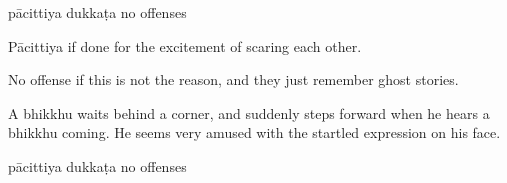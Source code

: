 \begin{exam}{\autoExamName}
\begin{problem*}
\begin{parts}
      \bigskip

      \begin{answers}{3}
        \bChoices
         pācittiya\eAns
         dukkaṭa\eAns
         no offenses\eAns
        \eChoices
      \end{answers}

      \begin{solution}
        Pācittiya if done for the excitement of scaring each other.

        No offense if this is not the reason, and they just remember ghost stories.
      \end{solution}

      \bigskip

      \item A bhikkhu waits behind a corner, and suddenly steps forward when he
      hears a bhikkhu coming. He seems very amused with the startled expression
      on his face.

      \bigskip

      \begin{answers}{3}
        \bChoices
         pācittiya\eAns
         dukkaṭa\eAns
         no offenses\eAns
        \eChoices
      \end{answers}

    \end{parts}

  \end{problem*}

\end{exam}
